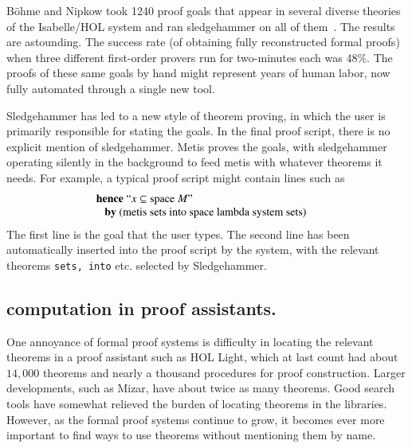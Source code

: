 \documentclass{llncs}
\begin{document}

B\"ohme and Nipkow 
took 1240 proof goals that appear in several diverse theories of the
Isabelle/HOL system and ran sledgehammer on all of
them~\cite{Boehme-Nipkow-IJCAR10}. The results are astounding. The
success rate (of obtaining fully reconstructed formal proofs) when
three different first-order provers run for two-minutes each was 48\%.
The proofs of these same goals by hand might represent years of human
labor, now fully automated through a single new tool.

Sledgehammer has led to a new style of theorem proving, in which the
user is primarily responsible for stating the goals.  In the final
proof script, there is no explicit mention of sledgehammer.  Metis
proves the goals, with sledgehammer operating silently in the
background to feed metis with whatever theorems it needs.  For
example, a typical proof script might contain lines such as
\cite{Paar}
\[
\begin{array}{ll}
\text{{\bf hence} ``$x \subseteq \text{space}~M$''}\\
\text{~~~{\bf by} (metis sets into space lambda system sets)}&
\end{array}
\]
The first line is the goal that the user types. The second line has been
automatically inserted into the proof script by the system, with the relevant
theorems {\tt sets, into} etc. selected by Sledgehammer.



\subsection{computation in proof assistants.}

One annoyance of formal proof systems is difficulty in locating the
relevant theorems in a proof assistant such as HOL Light, which at
last count had about $14,000$ theorems and nearly a thousand
procedures for proof construction.  Larger developments, such as
Mizar, have about twice as many theorems.  Good search tools have
somewhat relieved the burden of locating theorems in the libraries.
However, as the formal proof systems continue to grow, it becomes ever
more important to find ways to use theorems without mentioning them by
name.

\end{document}
